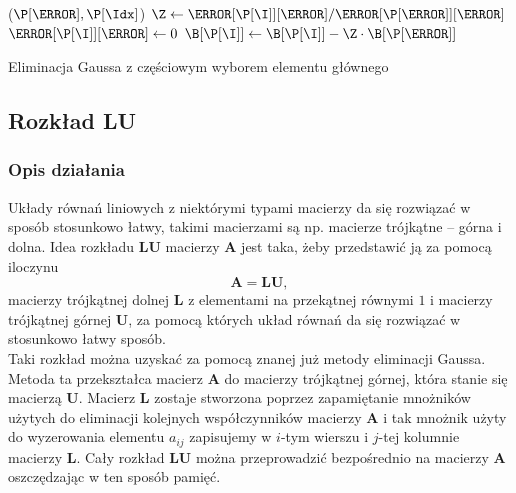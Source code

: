 \documentclass{mk-polish-lab-report}
\newcommand{\mA}{\bm{A}}
\newcommand{\mL}{\bm{L}}
\newcommand{\mU}{\bm{U}}
\begin{document}
\begin{algorithm}[h]
{{{		    			
		    			\Swap($\P[\K], \P[\Idx]$)\;
		    			$\Z \gets \A[\P[\I]][\K] / \A[\P[\K]][\K]$\;
		    			$\A[\P[\I]][\K] \gets 0 $ \;
		    			$\B[\P[\I]] \gets \B[\P[\I]] - \Z \cdot \B[\P[\K]]$\;
		    		}
		    		}
		   		   
    			\KwRet \X\;
			}
\caption{Eliminacja Gaussa z częściowym wyborem elementu głównego}\label{alg:pivotgauss}
\end{algorithm} 

\subsection{Rozkład LU}

\subsubsection{Opis działania}

Układy równań liniowych z niektórymi typami macierzy da się rozwiązać w sposób stosunkowo łatwy, takimi macierzami są np. macierze trójkątne -- górna i dolna. Idea rozkładu $\bm{LU}$ macierzy $\mA$ jest taka, żeby przedstawić ją za pomocą iloczynu
\begin{equation}
\mA = \mL\mU,
\end{equation}
macierzy trójkątnej dolnej $\mL$ z elementami na przekątnej równymi $1$ i macierzy trójkątnej górnej $\mU$, za pomocą których układ równań da się rozwiązać w stosunkowo łatwy sposób. \\

\noindent Taki rozkład można uzyskać za pomocą znanej już metody eliminacji Gaussa. Metoda ta przekształca macierz $\mA$ do macierzy trójkątnej górnej, która stanie się macierzą $\mU$. Macierz $\mL$ zostaje stworzona poprzez zapamiętanie mnożników użytych do eliminacji kolejnych współczynników macierzy $\mA$ i tak mnożnik użyty do wyzerowania elementu $a_{ij}$ zapisujemy w $i$-tym wierszu i $j$-tej kolumnie macierzy $\mL$. Cały rozkład $\mL\mU$ można przeprowadzić bezpośrednio na macierzy $\mA$ oszczędzając w ten sposób pamięć. \\
\end{document}
